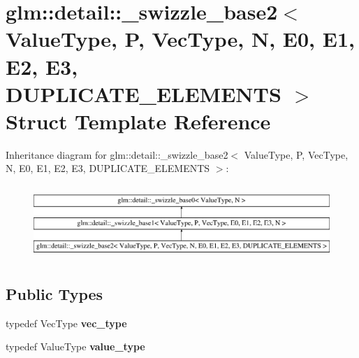 \hypertarget{structglm_1_1detail_1_1__swizzle__base2}{\section{glm\-:\-:detail\-:\-:\-\_\-swizzle\-\_\-base2$<$ Value\-Type, P, Vec\-Type, N, E0, E1, E2, E3, D\-U\-P\-L\-I\-C\-A\-T\-E\-\_\-\-E\-L\-E\-M\-E\-N\-T\-S $>$ Struct Template Reference}
\label{structglm_1_1detail_1_1__swizzle__base2}
}
Inheritance diagram for glm\-:\-:detail\-:\-:\-\_\-swizzle\-\_\-base2$<$ Value\-Type, P, Vec\-Type, N, E0, E1, E2, E3, D\-U\-P\-L\-I\-C\-A\-T\-E\-\_\-\-E\-L\-E\-M\-E\-N\-T\-S $>$\-:\begin{figure}[H]
\begin{center}
\leavevmode
\includegraphics[height=2.823529cm]{structglm_1_1detail_1_1__swizzle__base2}
\end{center}
\end{figure}
\subsection*{Public Types}
\begin{DoxyCompactItemize}
\item 
\hypertarget{structglm_1_1detail_1_1__swizzle__base2_a5f999904e676a4f5b0bdaa157415ee1c}{typedef Vec\-Type {\bfseries vec\-\_\-type}}\label{structglm_1_1detail_1_1__swizzle__base2_a5f999904e676a4f5b0bdaa157415ee1c}

\item 
\hypertarget{structglm_1_1detail_1_1__swizzle__base2_a656c11aaeeaca042deed88711c9dc063}{typedef Value\-Type {\bfseries value\-\_\-type}}\label{structglm_1_1detail_1_1__swizzle__base2_a656c11aaeeaca042deed88711c9dc063}

\end{DoxyCompactItemize}
